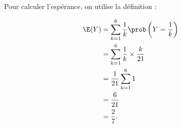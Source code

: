 {\begin{enumerate}
{    Pour calculer l'espérance, on utilise la définition :

    \begin{align*}
        \E(Y) &= \sum_{k=1}^6 \frac{1}{k} \prob\left(Y=\frac{1}{k}\right) \\
        &= \sum_{k=1}^6 \frac{1}{k} \times \frac{k}{21} \\
        &= \frac{1}{21} \sum_{k=1}^6 1 \\
        &= \frac{6}{21} \\
        &= \frac{2}{7}.
    \end{align*}
 }
\end{enumerate}

}